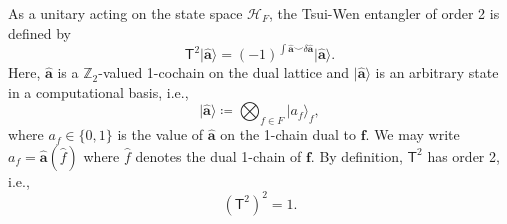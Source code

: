 \documentclass[aps,twocolumn,prx,floatfix,preprintnumbers, nofootinbib,10pt]{revtex4-2}
\numberwithin{equation}{section}
\theoremstyle{definition}
\theoremstyle{remark}
\theoremstyle{claim}
\def\ket#1{{|{#1}\rangle}}
\renewcommand{\sf}[1]{\mathsf{#1}}
\newcommand{\paren}[1]{\left( #1 \right)}
\begin{document}
As a unitary acting on the state space $\mathcal{H}_F$, the Tsui-Wen entangler of order 2 is defined by \cite{Tsui:2019ykk, Chen:2020msl}
\begin{equation}
\sf{T}^2 \ket{\hat{\bm{a}}}= (-1)^{\int \hat{\bm{a}} \smile \delta \hat{\bm{a}}} \ket{\hat{\bm{a}}}.
\label{eq: UTW def}
\end{equation}
Here, $\hat{\bm{a}}$ is a $\mathbb{Z}_2$-valued 1-cochain on the dual lattice and $\ket{\hat{\bm{a}}}$ is an arbitrary state in a computational basis, i.e.,
\begin{equation}
\ket{\hat{\bm{a}}} \coloneq \bigotimes_{f \in F} \ket{a_f}_f,
\end{equation}
where $a_f \in \{0, 1\}$ is the value of $\hat{\bm{a}}$ on the 1-chain dual to $\bm{f}$.
We may write $a_f = \hat{\bm{a}}(\hat{f})$ where $\hat{f}$ denotes the dual 1-chain of $\bm{f}$.
By definition, $\sf{T}^2$ has order 2, i.e.,
\begin{equation}
\paren{\sf{T}^2}^2 = 1.
\end{equation}
\end{document}
